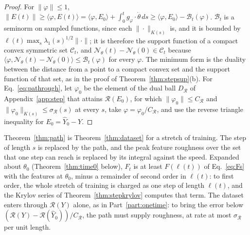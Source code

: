 \documentclass[11pt]{article}
\theoremstyle{definition}
\theoremstyle{remark}
\newcommand{\Net}{\mathcal{N}_\theta}    %
\newcommand{\Rgh}{\mathcal{R}}           %
\newcommand{\sR}{\sigma_{\Rgh}}
\newcommand{\CR}{C_{\Rgh}}
\newcommand{\ip}[2]{\langle #1,#2\rangle}
\newcommand{\cost}{\mathcal{B}}          %
\begin{document}
\begin{proof}
For $\|\varphi\|\le1$, $\|E(t)\|\ge\ip{\varphi}{E(t)} = \ip{\varphi}{E_0} + \int_0^tg_\varphi\cdot\dot\theta\,ds\ge\ip{\varphi}{E_0} - \cost_t(\varphi)$.
$\cost_t$ is a seminorm on sampled functions, since each $\|\cdot\|_{K(s)}$ is, and it is bounded by $\ell(t)\max_s\lambda_1(s)^{1/2}\|\cdot\|$; it is therefore the support function of a compact convex symmetric set $\mathcal{C}_t$, and $\Net(t) - \Net(0)\in\mathcal{C}_t$ because $\ip{\varphi}{\Net(t) - \Net(0)}\le\cost_t(\varphi)$ for every $\varphi$.
The minimum form is the duality between the distance from a point to a compact convex set and the support function of that set, as in the proof of Theorem~\ref{thm:stepsup}(b).
For Eq.~\eqref{eq:pathrough}, let $\varphi_0$ be the element of the dual ball $D_\Rgh$ of Appendix~\ref{app:step} that attains $\Rgh(E_0)$, for which $\|\varphi_0\|\le\CR$ and $\|\varphi_0\|_{K(s)}\le\sR(s)$ at every $s$, take $\varphi = \varphi_0/\CR$, and use the reverse triangle inequality for $E_0 = \hat Y_0 - Y$.
\end{proof}

Theorem~\ref{thm:path} is Theorem~\ref{thm:dataset} for a stretch of training.
The step of length $s$ is replaced by the path, and the peak feature roughness over the set that one step can reach is replaced by its integral against the speed.
Expanded about $\theta_0$ (Theorem~\ref{thm:time0} below), $F_t$ is at least $F(\ell(t))$ of Eq.~\eqref{eq:Fs} with the features at $\theta_0$, minus a remainder of second order in $\ell(t)$: to first order, the whole stretch of training is charged as one step of length $\ell(t)$, and the Krylov series of Theorem~\ref{thm:stepkrylov} computes that term.
The dataset enters through $\Rgh(Y)$ alone, as in Part~\ref{part:onetime}: to bring the error below $(\Rgh(Y) - \Rgh(\hat Y_0))/\CR$, the path must supply roughness, at rate at most $\sR$ per unit length.
\end{document}
